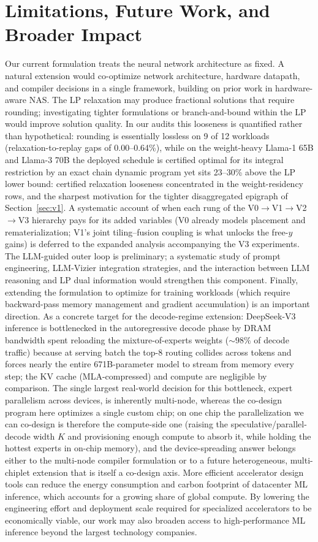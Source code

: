 
\section{Limitations, Future Work, and Broader Impact}
Our current formulation treats the neural network architecture as fixed.
A natural extension would co-optimize network architecture, hardware datapath, and compiler decisions in a single framework, building on prior work in hardware-aware NAS.
The LP relaxation may produce fractional solutions that require rounding; investigating tighter formulations or branch-and-bound within the LP would improve solution quality.
In our audits this looseness is quantified rather than hypothetical: rounding is essentially lossless on 9 of 12 workloads (relaxation-to-replay gaps of 0.00--0.64\%), while on the weight-heavy Llama-1 65B and Llama-3 70B the deployed schedule is certified optimal for its integral restriction by an exact chain dynamic program yet sits 23--30\% above the LP lower bound: certified relaxation looseness concentrated in the weight-residency rows, and the sharpest motivation for the tighter disaggregated epigraph of Section~\ref{sec:v1}.
A systematic account of when each rung of the V0$\to$V1$\to$V2$\to$V3 hierarchy pays for its added variables (V0 already models placement and rematerialization; V1's joint tiling--fusion coupling is what unlocks the free-$y$ gains) is deferred to the expanded analysis accompanying the V3 experiments.
The LLM-guided outer loop is preliminary; a systematic study of prompt engineering, LLM-Vizier integration strategies, and the interaction between LLM reasoning and LP dual information would strengthen this component.
Finally, extending the formulation to optimize for training workloads (which require backward-pass memory management and gradient accumulation) is an important direction.
As a concrete target for the decode-regime extension: DeepSeek-V3 inference is bottlenecked in the autoregressive decode phase by DRAM bandwidth spent reloading the mixture-of-experts weights (${\sim}98\%$ of decode traffic) because at serving batch the top-8 routing collides across tokens and forces nearly the entire 671B-parameter model to stream from memory every step; the KV cache (MLA-compressed) and compute are negligible by comparison.
The single largest real-world decision for this bottleneck, expert parallelism across devices, is inherently multi-node, whereas the co-design program here optimizes a single custom chip; on one chip the parallelization we can co-design is therefore the compute-side one (raising the speculative/parallel-decode width $K$ and provisioning enough compute to absorb it, while holding the hottest experts in on-chip memory), and the device-spreading answer belongs either to the multi-node compiler formulation or to a future heterogeneous, multi-chiplet extension that is itself a co-design axis.
More efficient accelerator design tools can reduce the energy consumption and carbon footprint of datacenter ML inference, which accounts for a growing share of global compute.
By lowering the engineering effort and deployment scale required for specialized accelerators to be economically viable, our work may also broaden access to high-performance ML inference beyond the largest technology companies.
